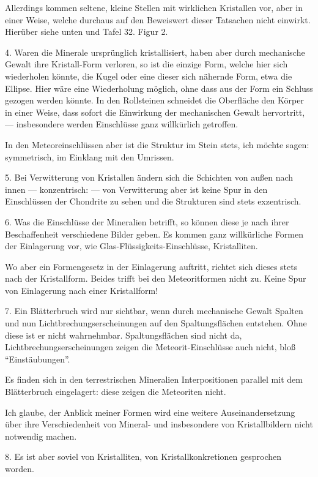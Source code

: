 \documentclass[a4paper, 12pt, oneside]{article}
\begin{document}
Allerdings kommen seltene, kleine Stellen mit wirklichen Kristallen vor, aber in einer Weise, welche durchaus auf den Beweiswert dieser Tatsachen nicht einwirkt. Hierüber siehe unten und Tafel 32. Figur 2.

4. Waren die Minerale ursprünglich kristallisiert, haben aber durch mechanische Gewalt ihre Kristall-Form verloren, so ist die einzige Form, welche hier sich wiederholen könnte, die Kugel oder eine dieser sich nähernde Form, etwa die Ellipse. Hier wäre eine Wiederholung möglich, ohne dass aus der Form ein Schluss gezogen werden könnte. In den Rollsteinen schneidet die Oberfläche den Körper in einer Weise, dass sofort die Einwirkung der mechanischen Gewalt hervortritt, — insbesondere werden Einschlüsse ganz willkürlich getroffen.

In den Meteoreinschlüssen aber ist die Struktur im Stein stets, ich möchte sagen: symmetrisch, im Einklang mit den Umrissen.

5. Bei Verwitterung von Kristallen ändern sich die Schichten von außen nach innen — konzentrisch: — von Verwitterung aber ist keine Spur in den Einschlüssen der Chondrite zu sehen und die Strukturen sind stets exzentrisch.

6. Was die Einschlüsse der Mineralien betrifft, so können diese je nach ihrer Beschaffenheit verschiedene Bilder geben. Es kommen ganz willkürliche Formen der Einlagerung vor, wie Glas-Flüssigkeits-Einschlüsse, Kristalliten.

Wo aber ein Formengesetz in der Einlagerung auftritt, richtet sich dieses stets nach der Kristallform. Beides trifft bei den Meteoritformen nicht zu. Keine Spur von Einlagerung nach einer Kristallform!

7. Ein Blätterbruch wird nur sichtbar, wenn durch mechanische Gewalt Spalten und nun Lichtbrechungserscheinungen auf den Spaltungsflächen entstehen. Ohne diese ist er nicht wahrnehmbar. Spaltungsflächen sind nicht da, Lichtbrechungserscheinungen zeigen die Meteorit-Einschlüsse auch nicht, bloß "`Einstäubungen"'.

Es finden sich in den terrestrischen Mineralien Interpositionen parallel mit dem Blätterbruch eingelagert: diese zeigen die Meteoriten nicht.

Ich glaube, der Anblick meiner Formen wird eine weitere Auseinandersetzung über ihre Verschiedenheit von Mineral- und insbesondere von Kristallbildern nicht notwendig machen.

8. Es ist aber soviel von Kristalliten, von Kristallkonkretionen gesprochen worden.
\end{document}
